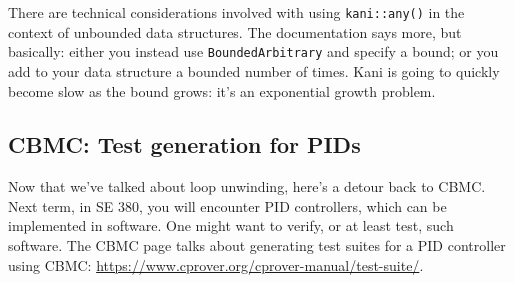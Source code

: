 \documentclass[11pt]{article}
\begin{document}
There are technical considerations involved with using \texttt{kani::any()} in the context of unbounded
data structures. The documentation says more, but basically: either you instead use \texttt{BoundedArbitrary}
and specify a bound; or you add to your data structure a bounded number of times. Kani is going to quickly
become slow as the bound grows: it's an exponential growth problem.

\subsection*{CBMC: Test generation for PIDs}
Now that we've talked about loop unwinding, here's a detour back to CBMC.
Next term, in SE 380, you will encounter PID controllers, which can be
implemented in software. One might want to verify, or at least test, such software.
The CBMC page talks about generating test suites for a PID controller using CBMC:
\url{https://www.cprover.org/cprover-manual/test-suite/}.
\end{document}
